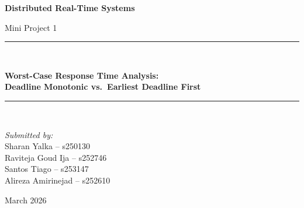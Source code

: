 \documentclass[12pt,a4paper]{article}
\begin{document}
\begin{titlepage}
\centering
\vspace*{2cm}

{\LARGE \bfseries Distributed Real-Time Systems\par}
\vspace{0.5cm}

{\Large Mini Project 1\par}
\vspace{1.5cm}

\rule{\linewidth}{0.5mm}\\[0.4cm]

{\huge \bfseries
Worst-Case Response Time Analysis:\\[0.3cm]
Deadline Monotonic vs.\ Earliest Deadline First\par}

\rule{\linewidth}{0.5mm}\\[1.5cm]

\vspace{1cm}

{\large \textit{Submitted by:}\\[0.3cm]
Sharan Yalka -- s250130\\
Raviteja Goud Ija -- s252746\\
Santos Tiago -- s253147\\
Alireza Amirinejad -- s252610\par}

\vfill

{\large March 2026\par}

\end{titlepage}



\tableofcontents
\newpage

\end{document}
